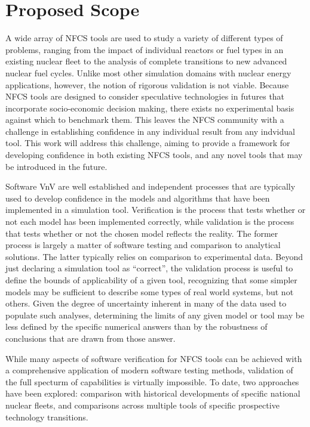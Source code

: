 \section{Proposed Scope}

A wide array of \gls{NFCS} tools\cite{DYMOND, ORION, VISION, COSI6, CLASS,
CYCLUS} are used to study a variety of different types of problems, ranging from
the impact of individual reactors or fuel types in an existing nuclear
fleet\cite{ZAKARI.ANE.2016} to the analysis of complete transitions to new
advanced nuclear fuel cycles\cite{hoffman.ICAPP.2016}.  Unlike most other
simulation domains with nuclear energy applications, however, the notion of
rigorous validation is not viable.  Because \gls{NFCS} tools are designed to
consider speculative technologies in futures that incorporate socio-economic
decision making, there exists no experimental basis against which to benchmark
them.  This leaves the \gls{NFCS} community with a challenge in establishing
confidence in any individual result from any indvidual tool.  This work will
address this challenge, aiming to provide a framework for developing confidence
in both existing \gls{NFCS} tools, and any novel tools that may be introduced in
the future.

Software \gls{VnV} are well established and independent processes that are
typically used to develop confidence in the models and algorithms that have
been implemented in a simulation tool.  Verification is the process that tests
whether or not each model has been implemented correctly, while validation is
the process that tests whether or not the chosen model reflects the reality.
The former process is largely a matter of software testing and comparison to
analytical solutions.  The latter typically relies on comparison to
experimental data.  Beyond just declaring a simulation tool as ``correct'',
the validation process is useful to define the bounds of applicability of a
given tool, recognizing that some simpler models may be sufficient to describe
some types of real world systems, but not others.  Given the degree of
uncertainty inherent in many of the data used to populate such analyses,
determining the limits of any given model or tool may be less defined by the
specific numerical answers than by the robustness of conclusions that are
drawn from those answer.  

While many aspects of software verification for \gls{NFCS} tools can be
achieved with a comprehensive application of modern software testing methods,
validation of the full specturm of capabilities is virtually impossible.  To
date, two approaches have been explored: comparison with historical
developments of specific national nuclear fleets, and comparisons across
multiple tools of specific prospective technology transitions.

